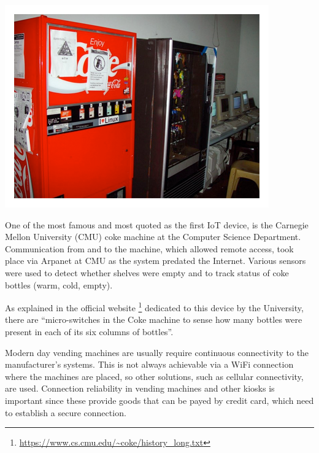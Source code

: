 			\noindent
			\begin{minipage}{0.5\textwidth}%
				\centering
				\includegraphics[width=\textwidth]{resources/img/coke}
			\end{minipage}%
			\hfill%
			\begin{minipage}{0.5\textwidth}\raggedright
				One of the most famous and most quoted as the first IoT device, is the Carnegie Mellon University (CMU) coke machine at the Computer Science Department.
				Communication from and to the machine, which allowed remote access, took place via Arpanet at CMU as the system predated the Internet.
				Various sensors were used to detect whether shelves were empty and to track status of coke bottles (warm, cold, empty).
			\end{minipage}
			\newline
			
			As explained in the official website \footnote{\url{https://www.cs.cmu.edu/~coke/history_long.txt}} dedicated to this device by the University, there are ``micro-switches in the Coke machine to sense how many bottles were present in each of its six columns of bottles''.
		
			Modern day vending machines are usually require continuous connectivity to the manufacturer's systems.
			This is not always achievable via a WiFi connection where the machines are placed, so other solutions, such as cellular connectivity, are used.
			Connection reliability in vending machines and other kiosks is important since these provide goods that can be payed by credit card, which need to establish a secure connection.
			

